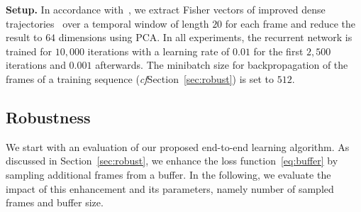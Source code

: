 \documentclass[10pt,twocolumn,letterpaper]{article}
\def\cf{\emph{cf}\onedot} \def\Cf{\emph{Cf}\onedot}
\begin{document}
\textbf{Setup.}
In accordance with~\cite{kuehne2017weakly,richard2017weakly,huang2016connectionist},
we extract Fisher vectors of improved dense trajectories~\cite{wang2013action}
over a temporal window of length $ 20 $ for each frame and reduce the result to
$ 64 $ dimensions using PCA.
In all experiments, the recurrent network is trained for $ 10,000 $ iterations with a learning rate of $ 0.01 $
for the first $ 2,500 $ iterations and $ 0.001 $ afterwards.
The minibatch size for backpropagation of the frames of a training sequence (\cf Section~\ref{sec:robust})
is set to $ 512 $.




\subsection{Robustness}
\label{sec:robustness}

We start with an evaluation of our proposed end-to-end learning algorithm. As discussed in Section~\ref{sec:robust}, we enhance the loss function~\eqref{eq:buffer} by sampling additional frames from a buffer. In the following, we evaluate the impact of this enhancement and its parameters, namely number of sampled frames and buffer size.  
\end{document}
